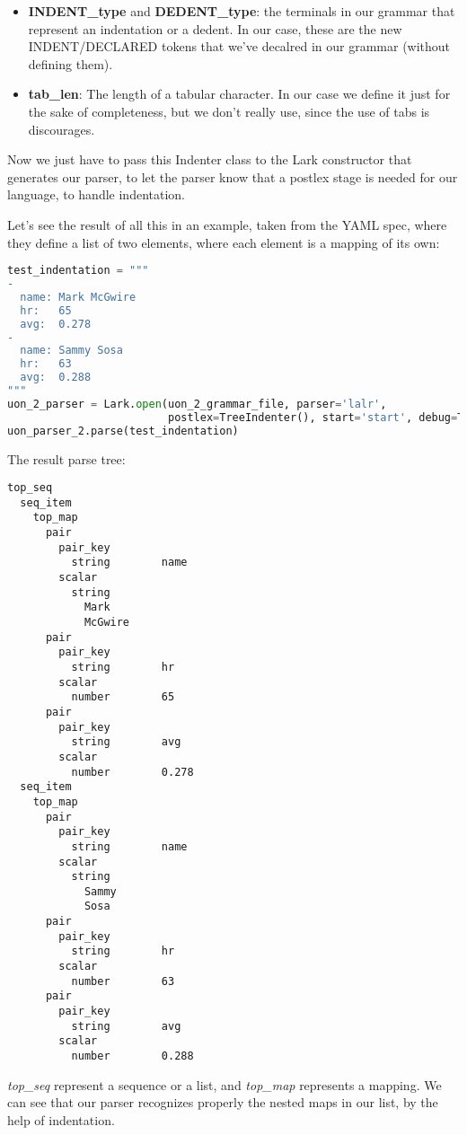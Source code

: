 \documentclass[12pt]{article}
\begin{document}
\begin{itemize}
    \item \textbf{INDENT\_type} and \textbf{DEDENT\_type}: the terminals in our grammar that represent an indentation or a dedent. In our case, these are the new INDENT/DECLARED tokens that we've decalred in our grammar (without defining them).
    \item \textbf{tab\_len}: The length of a tabular character. In our case we define it just for the sake of completeness, but we don't really use, since the use of tabs is discourages.
\end{itemize}

Now we just have to pass this Indenter class to the Lark constructor that generates our parser, to let the parser know that a postlex stage is needed for our language, to handle indentation.

Let's see the result of all this in an example, taken from the YAML spec, where they define a list of two elements, where each element is a mapping of its own:
\begin{lstlisting}[language=Python]
test_indentation = """
-
  name: Mark McGwire
  hr:   65
  avg:  0.278
-
  name: Sammy Sosa
  hr:   63
  avg:  0.288
"""
uon_2_parser = Lark.open(uon_2_grammar_file, parser='lalr',
                         postlex=TreeIndenter(), start='start', debug=True)
uon_parser_2.parse(test_indentation)
\end{lstlisting}

The result parse tree:

\begin{lstlisting}
top_seq
  seq_item
    top_map
      pair
        pair_key
          string        name
        scalar
          string
            Mark
            McGwire
      pair
        pair_key
          string        hr
        scalar
          number        65
      pair
        pair_key
          string        avg
        scalar
          number        0.278
  seq_item
    top_map
      pair
        pair_key
          string        name
        scalar
          string
            Sammy
            Sosa
      pair
        pair_key
          string        hr
        scalar
          number        63
      pair
        pair_key
          string        avg
        scalar
          number        0.288
\end{lstlisting}

\emph{top\_seq} represent a sequence or a list, and \emph{top\_map} represents a mapping. We can see that our parser recognizes properly the nested maps in our list, by the help of indentation.
\end{document}
